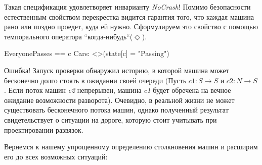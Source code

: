 \documentclass[14pt, openany]{report}
\begin{document}
Такая спецификация удовлетворяет инварианту \emph{NoCrash}! Помимо безопасности естественным свойством перекрестка видится гарантия того, что каждая машина рано или поздно проедет, куда ей нужно. Сформулируем это свойство с помощью темпорального оператора ``когда-нибудь``(\(\Diamond\)).

\begin{tla}
EveryonePasses ==
  \A c \in Cars: <>(state[c] = "Passing")
\end{tla}
\begin{tlatex}
%
\end{tlatex}

Ошибка! Запуск проверки обнаружил историю, в которой машина может бесконечно долго стоять в ожидании своей очереди (Пусть \(c1: S \rightarrow S\) и \(c2: N \rightarrow S\). Если поток машин \emph{c2} непрерывен, машина \emph{c1} будет обречена на вечное ожидание возможности разворота). Очевидно, в реальной жизни не может существовать бесконечного потока машин, однако полученный результат свидетельствует о ситуации на дороге, которую стоит учитывать при проектировании развязок.
 
Вернемся к нашему упрощенному определению столкновения машин и расширим его до всех возможных ситуаций:
\end{document}
